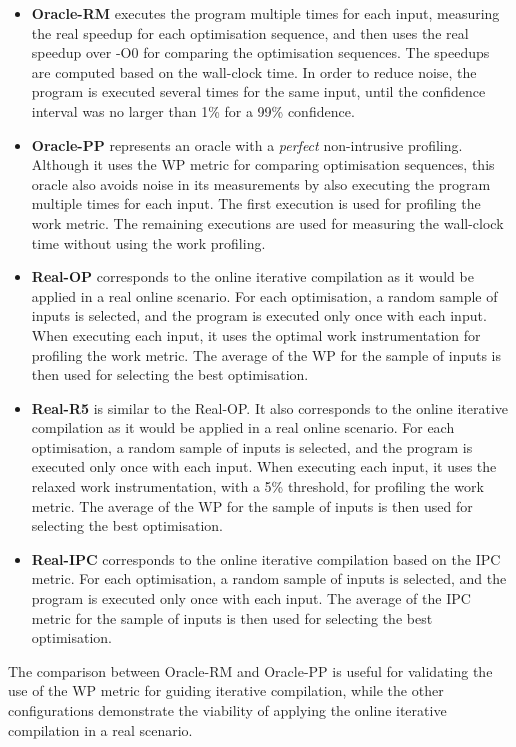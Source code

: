 \documentclass[sigplan,10pt]{acmart}
\theoremstyle{definition}
\newcommand{\itercomp}{{iterative compilation}}
\newcommand{\flagstype}{\usefont{T1}{cmr}{m}{n}}
\begin{document}
\begin{itemize}
\item \textbf{Oracle-RM} executes the program multiple times for each input, measuring the real speedup for each optimisation sequence, and then uses the real speedup over {\flagstype -O0} for comparing the optimisation sequences.
  The speedups are computed based on the wall-clock time.
  In order to reduce noise, the program is executed several times for the same input, until the confidence interval was no larger than 1\% for a 99\% confidence.
\item \textbf{Oracle-PP} represents an oracle with a \textit{perfect} non-intrusive profiling.
  Although it uses the WP metric for comparing optimisation sequences, this oracle also avoids noise in its measurements by also executing the program multiple times for each input.
  The first execution is used for profiling the work metric.
  The remaining executions are used for measuring the wall-clock time without using the work profiling.
\item \textbf{Real-OP} corresponds to the online {\itercomp} as it would be applied in a real online scenario.
  For each optimisation, a random sample of inputs is selected, and the program is executed only once with each input.
  When executing each input, it uses the optimal work instrumentation for profiling the work metric.
  The average of the WP for the sample of inputs is then used for selecting the best optimisation.
\item \textbf{Real-R5} is similar to the {Real-OP}.
  It also corresponds to the online {\itercomp} as it would be applied in a real online scenario.
  For each optimisation, a random sample of inputs is selected, and the program is executed only once with each input.
  When executing each input, it uses the relaxed work instrumentation, with a 5\% threshold, for profiling the work metric.
  The average of the WP for the sample of inputs is then used for selecting the best optimisation.
\item \textbf{Real-IPC} corresponds to the online {\itercomp} based on the IPC metric.
  For each optimisation, a random sample of inputs is selected, and the program is executed only once with each input.
  The average of the IPC metric for the sample of inputs is then used for selecting the best optimisation.
\end{itemize}
The comparison between Oracle-RM and Oracle-PP is useful for validating the use of the WP metric for guiding {\itercomp}, while the other configurations demonstrate the viability of applying the online {\itercomp} in a real scenario.
\end{document}
